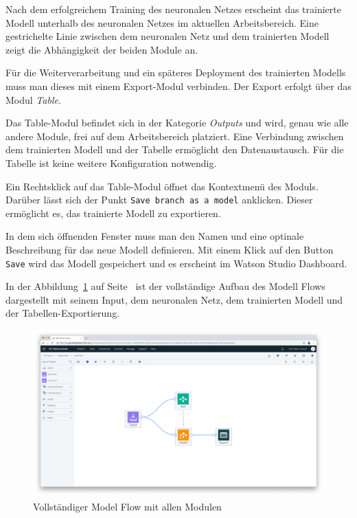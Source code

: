Nach dem erfolgreichem Training des neuronalen Netzes erscheint das trainierte Modell unterhalb des neuronalen Netzes im
aktuellen Arbeitsbereich. Eine gestrichelte Linie zwischen dem neuronalen Netz und dem trainierten Modell zeigt die
Abhängigkeit der beiden Module an.

Für die Weiterverarbeitung und ein späteres Deployment des trainierten Modells muss man dieses mit einem Export-Modul
verbinden. Der Export erfolgt über das Modul \textit{Table}.

Das Table-Modul befindet sich in der Kategorie \textit{Outputs} und wird, genau wie alle andere Module, frei auf dem
Arbeitsbereich platziert. Eine Verbindung zwischen dem trainierten Modell und der Tabelle ermöglicht den Datenaustausch.
Für die Tabelle ist keine weitere Konfiguration notwendig.

Ein Rechtsklick auf das Table-Modul öffnet das Kontextmenü des Moduls. Darüber lässt sich der Punkt
\texttt{Save branch as a model} anklicken. Dieser ermöglicht es, das trainierte Modell zu exportieren.

In dem sich öffnenden Fenster muss man den Namen und eine optinale Beschreibung für das neue Modell definieren. Mit
einem Klick auf den Button \texttt{Save} wird das Modell gespeichert und es erscheint im Watson Studio Dashboard.

In der Abbildung~\ref{fig:umsetzung_model_flow} auf Seite~\pageref{fig:umsetzung_model_flow} ist der vollständige Aufbau
des Modell Flows dargestellt mit seinem Input, dem neuronalen Netz, dem trainierten Modell und der
Tabellen-Exportierung.

\begin{figure}[h]
    \centering
    \includegraphics[width=\textwidth]{images/kapitel_3/umsetzung_model_flow.png}
    \caption{Vollständiger Model Flow mit allen Modulen}
    \label{fig:umsetzung_model_flow}
\end{figure}

